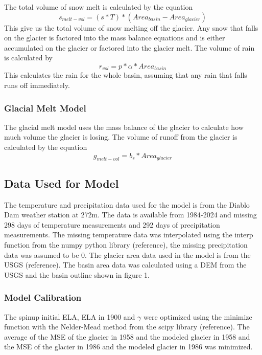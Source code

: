 \documentclass{article}
\begin{document}
The total volume of snow melt is calculated by the equation
\begin{equation}s_{melt-vol}=(s*T)*({Area}_{basin}-{Area}_{glacier})\end{equation}
This give us the total volume of snow melting off the glacier. Any snow that falls on the glacier is factored into the mass balance equations 
and is either accumulated on the glacier or factored into the glacier melt.
The volume of rain is calculated by
\begin{equation}r_{vol}=p*\alpha*{Area}_{basin}\end{equation}
This calculates the rain for the whole basin, assuming that any rain that falls runs off immediately.

\subsubsection{Glacial Melt Model}
The glacial melt model uses the mass balance of the glacier to calculate how much volume the glacier is losing. The volume of runoff from the 
glacier is calculated by the equation
\begin{equation}g_{melt-vol}=b_s*{Area}_{glacier}\end{equation}
\subsection{Data Used for Model}
The temperature and precipitation data used for the model is from the Diablo Dam weather station at 272m. The data is available from 1984-2024 
and missing 298 days of temperature measurements and 292 days of precipitation measurements. The missing temperature data was interpolated 
using the interp function from the numpy python library (reference), the missing precipitation data was assumed to be 0. The glacier area data used in 
the model is from the USGS (reference). The basin area data was calculated using a DEM from the USGS and the basin outline shown in figure 1.

\subsubsection{Model Calibration}
The spinup initial ELA, ELA in 1900 and $\gamma$ were optimized using the minimize function with the Nelder-Mead method from the scipy library (reference).
The average of the MSE of the glacier in 1958 and the modeled glacier in 1958 and the MSE of the glacier in 1986 and the modeled glacier in 1986 was minimized.
\end{document}
